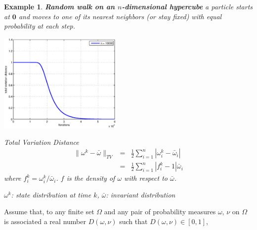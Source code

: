 \documentclass[dvips,landscape]{foils}
\newtheorem{example}{Example}
\begin{document}
\begin{example} \textbf{Random walk on an $n$-dimensional hypercube}
a particle starts at $\mathbf{0}$ and moves to one of its nearest neighbors (or stay fixed) with equal probability at each step.

\includegraphics[width=0.45\textwidth,trim=1cm -1cm 0cm 0cm]{cutoffexample}
\parbox[b]{12cm}{
  Total Variation Distance
  \begin{eqnarray*}
   \|\omega^k - \bar{\omega}\|_{TV} &=& \frac{1}{2}\sum_{i=1}^n |\omega_i^k-\bar{\omega}_i |\\
               &=& \frac{1}{2}\sum_{i=1}^n |f_i^k-1|\bar{\omega}_i
  \end{eqnarray*}
  where $f^k_i = \omega_i^k/\bar{\omega}_i$. $f$ is the density of $\omega$ with respect to $\bar{\omega}$.
   }
    $\omega^k$: state distribution at time $k$, 
    $\bar{\omega}$: invariant distribution  
\end{example} 

\newpage
Assume that, to any finite set $\Omega$ and any
pair of probability measures $\omega$, $\nu$ on $\Omega$ is associated
a real number $D(\omega,\nu)$ such that $D(\omega,\nu)\in [0,1]$,
\end{document}
